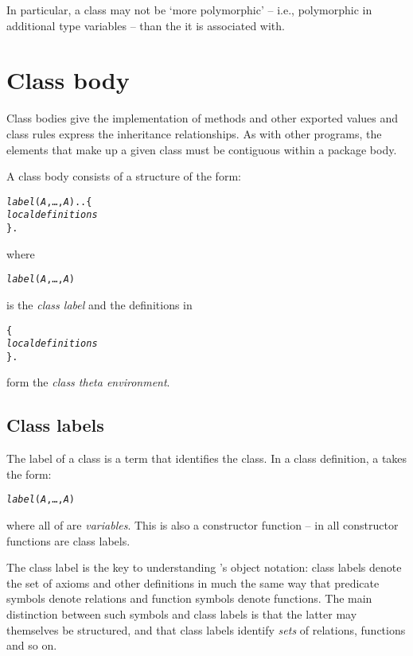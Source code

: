 In particular, a class may not be `more polymorphic' -- i.e., polymorphic in additional type variables -- than the  it is associated with.


\section{Class body}
\label{object:class body}
Class bodies give the implementation of methods and other exported values and class rules express the inheritance relationships. As with other programs, the elements that make up a given class must be contiguous within a package body.

A class body consists of a structure of the form:
\begin{alltt}
\emph{label}(\emph{A},\ldots,\emph{A\subn})..\{
  \emph{local definitions}
\}.
\end{alltt}
where
\begin{alltt}
\emph{label}(\emph{A},\ldots,\emph{A\subn})
\end{alltt}
is the \emph{class label} and the definitions in
\begin{alltt}
\{
  \emph{local definitions}
\}.
\end{alltt}
form the \emph{class theta environment}.

\subsection{Class labels}
\label{object:class label}
The label of a class is a term that identifies the class. In a class definition, a  takes the form:
\begin{alltt}
\emph{label}(\emph{A},\ldots,\emph{A\subn})
\end{alltt}
where all of  are \emph{variables}. This is also a constructor function -- in \go all constructor functions are class labels.

The class label is the key to understanding \go's object notation: class labels denote the set of axioms and other definitions in much the same way that predicate symbols denote relations and function symbols denote functions. The main distinction between such symbols and class labels is that the latter may themselves be structured, and that class labels identify \emph{sets} of relations, functions and so on.

